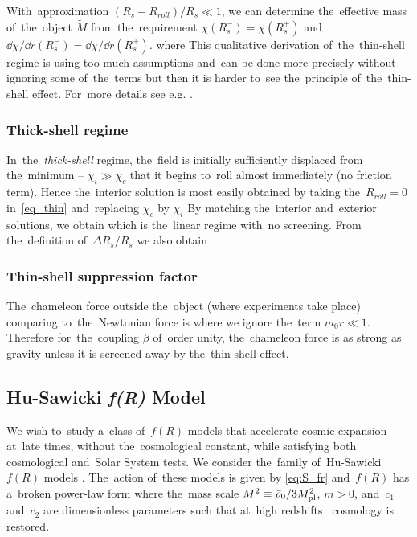 {With~approximation $(R_s-R_{roll})/R_s\ll1$, we can determine the~effective mass of~the~object $\tilde{M}$ from the~requirement $\chi(R_s^-)=\chi(R_s^+)$ and~$\dd\chi/\dd r(R_s^-)=\dd\chi/\dd r(R_s^+)$.
where
This qualitative derivation of~the~thin-shell regime is using too much assumptions and~can be done more precisely without ignoring some of~the~terms but then it is harder to~see the~principle of~the~thin-shell effect. For~more details see e.g. \textcite{Tamaki:2008mf,2007PhRvD..75f3501M,Waterhouse:2006wv}.
\subsubsection{Thick-shell regime}
In~the~\textit{thick-shell} regime, the~field is initially sufficiently displaced from the~minimum -- $\chi_i\gg\chi_c$ that it begins to~roll almost immediately (no friction term). Hence the~interior solution is most easily obtained by taking the~$R_{roll}=0$ in~\eqref{eq_thin} and~replacing $\chi_c$ by $\chi_i$
By matching the~interior and~exterior solutions, we obtain
which is the~linear regime with~no screening. From the~definition of~$\Delta R_s/R_s$ we also obtain
\subsubsection{Thin-shell suppression factor}
The~chameleon force outside the~object (where experiments take place) comparing to~the~Newtonian force is
where we ignore the~term $m_0 r\ll1$. Therefore for~the~coupling $\beta$ of~order unity, the~chameleon force is as strong as gravity unless it is screened away by the~thin-shell effect.
} 
\subsection{Hu-Sawicki \texorpdfstring{\textit{\lowercase{f}(R)}}{fR} Model}
We wish to~study a~class of~$f(R)$ models that accelerate cosmic expansion at~late times, without the~cosmological constant, while satisfying both cosmological and~Solar System tests. We consider the~family of~Hu-Sawicki $f(R)$ models \parencite{Hu-Saw}. The~action of~these models is given by \eqref{eq:S_fr} and~$f(R)$ has a~broken power-law form
where the~mass scale $M^2\equiv\bar\rho_0/3M_{\text{\scriptsize pl}}^2$, $m>0$, and~$c_1$ and~$c_2$ are dimensionless parameters such that at~high redshifts \LCDM\ cosmology is restored.

